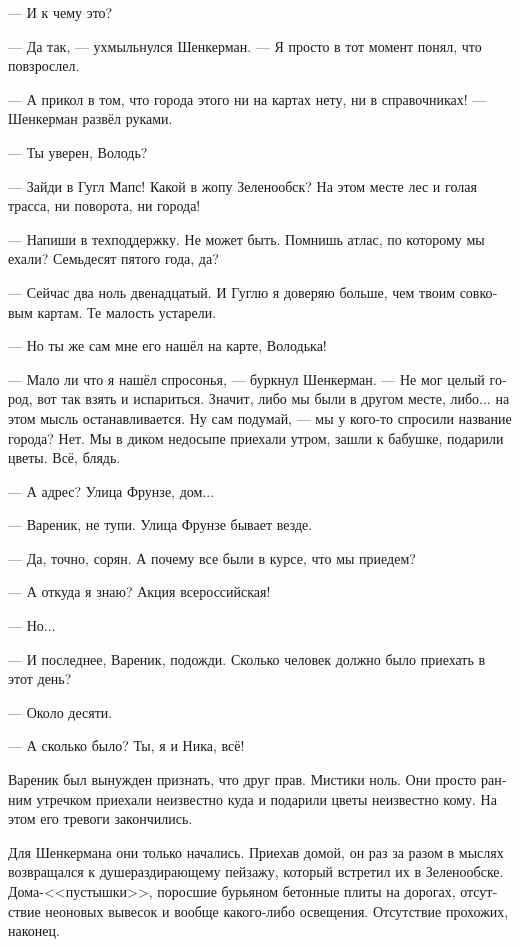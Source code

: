 \documentclass[a5paper,12pt,fleqn]{extbook}\usepackage{cooltooltips}\usepackage{polyglossia}\setdefaultlanguage[babelshorthands=true]{russian}\setotherlanguage{english}\defaultfontfeatures{Ligatures=TeX,Mapping=tex-text} \usepackage{xcolor}\definecolor{lightgray}{HTML}{bbbbbb}\color{lightgray}\newcommand{\ml}[3]{\textenglish{\textcolor{black}{#3}}}
\newcommand{\asterism}{\vspace{1em}{\centering\Large\bfseries$\ast~\ast~\ast$\par}\vspace{1em}}
\newcommand{\textspace}{\vspace{1em}{\centering\Large\bfseries<...>\par}\vspace{1em}}
\begin{document}
--- И к чему это?

--- Да так, --- ухмыльнулся Шенкерман.
--- Я просто в тот момент понял, что повзрослел.

\asterism

\textspace

--- А прикол в том, что города этого ни на картах нету, ни в справочниках! --- Шенкерман развёл руками.

--- Ты уверен, Володь?

--- Зайди в Гугл Мапс!
Какой в жопу Зеленообск?
На этом месте лес и голая трасса, ни поворота, ни города!

--- Напиши в техподдержку.
Не может быть.
Помнишь атлас, по которому мы ехали?
Семьдесят пятого года, да?

--- Сейчас два ноль двенадцатый.
И Гуглю я доверяю больше, чем твоим совковым картам.
Те малость устарели.

--- Но ты же сам мне его нашёл на карте, Володька!

--- Мало ли что я нашёл спросонья, --- буркнул Шенкерман.
--- Не мог целый город, вот так взять и испариться.
Значит, либо мы были в другом месте, либо... на этом мысль останавливается.
Ну сам подумай, --- мы у кого-то спросили название города?
Нет.
Мы в диком недосыпе приехали утром, зашли к бабушке, подарили цветы.
Всё, блядь.

--- А адрес?
Улица Фрунзе, дом...

--- Вареник, не тупи.
Улица Фрунзе бывает везде.

--- Да, точно, сорян.
А почему все были в курсе, что мы приедем?

--- А откуда я знаю?
Акция всероссийская!

--- Но...

--- И последнее, Вареник, подожди.
Сколько человек должно было приехать в этот день?

--- Около десяти.

--- А сколько было?
Ты, я и Ника, всё!

Вареник был вынужден признать, что друг прав.
Мистики ноль.
Они просто ранним утречком приехали неизвестно куда и подарили цветы неизвестно кому.
На этом его тревоги закончились.

Для Шенкермана они только начались.
Приехав домой, он раз за разом в мыслях возвращался к душераздирающему пейзажу, который встретил их в Зеленообске.
Дома-<<пустышки>>, поросшие бурьяном бетонные плиты на дорогах, отсутствие неоновых вывесок и вообще какого-либо освещения.
Отсутствие прохожих, наконец.
\end{document}
